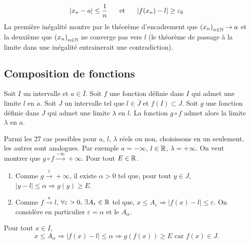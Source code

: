 \begin{demo}
\begin{itemize}
\begin{displaymath}
  |x_n - a| \leq \frac{1}{n} \hspace{0.5cm}\text{ et } \hspace{0.5cm}|f(x_n)-l|\geq \varepsilon_0
\end{displaymath}
La première inégalité montre par le théorème d'encadrement que $\left( x_n\right)_{n\in \mathbb{N}}\rightarrow a$ et la deuxième que $\left( x_n\right)_{n\in \mathbb{N}}$ ne converge pas vers $l$ (le théorème de passage à la limite dans une inégalité entrainerait une contradiction).
  \end{itemize}
\end{demo}

\subsection{Composition de fonctions}
\begin{thm}
 Soit $I$ un intervalle et $a\in \overline{I}$. Soit $f$ une fonction définie dans $I$ qui admet une limite $l$ en $a$.\newline
 Soit $J$ un intervalle tel que $l\in \overline{J}$ et $f(I)\subset J$.\newline
 Soit $g$ une fonction définie dans $J$ qui admet une limite $\lambda$ en $l$.\newline
 La fonction $g\circ f$ admet alors la limite $\lambda$ en $a$.
\end{thm}
\begin{demo}
 Parmi les 27 cas possibles pour $a$, $l$, $\lambda$ réels ou non, choisissons en un seulement, les autres sont analogues.\newline
 Par exemple $a=-\infty$, $l\in \mathbb{R}$, $\lambda = + \infty$. On veut montrer que $g \circ f \xrightarrow{-\infty} +\infty$.\newline
 Pour tout $E\in \mathbb{R}$.
 \begin{enumerate}
  \item Comme $g \xrightarrow{l} +\infty$, il existe $\alpha > 0$ tel que, pour tout $y\in J$, $|y - l |\leq \alpha \Rightarrow g(y) \geq E$.
  \item Comme $f\xrightarrow{a} l$, $\forall \varepsilon > 0,\, \exists A_\varepsilon\in \mathbb{R}$ tel que, $x\leq A_\varepsilon \Rightarrow \left|f(x) - l \right| \leq \varepsilon$. On considère en particulier $\varepsilon = \alpha$ et le $A_\alpha$.
 \end{enumerate}
Pour tout $x\in I$, 
\[
x\leq A_\alpha \Rightarrow \left|f(x) - l \right| \leq \alpha 
\Rightarrow g(f(x)) \geq E \text{ car } f(x) \in J.
\]
\end{demo}


